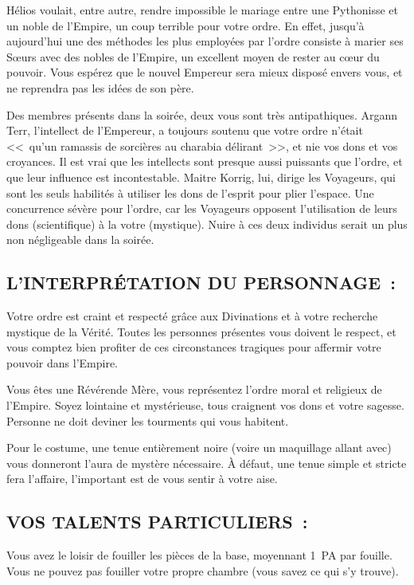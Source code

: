\documentclass[14pt,twocolumn]{extarticle}
\begin{document}
Hélios voulait, entre autre, rendre impossible le mariage entre une Pythonisse
et un noble de l'Empire, un coup terrible pour votre ordre. En effet, jusqu'à
aujourd'hui une des méthodes les plus employées par l'ordre consiste à marier
ses S\oe{}urs avec des nobles de l'Empire, un excellent moyen de rester au
c\oe{}ur du pouvoir. Vous espérez que le nouvel Empereur sera mieux disposé
envers vous, et ne reprendra pas les idées de son père.

Des membres présents dans la soirée, deux vous sont très antipathiques. Argann
Terr, l'intellect de l'Empereur, a toujours soutenu que votre ordre n'était
<<~qu'un ramassis de sorcières au charabia délirant~>>, et nie vos dons et vos
croyances. Il est vrai que les intellects sont presque aussi puissants que
l'ordre, et que leur influence est incontestable. Maitre Korrig, lui, dirige
les Voyageurs, qui sont les seuls habilités à utiliser les dons de l'esprit
pour plier l'espace. Une concurrence sévère pour l'ordre, car les Voyageurs
opposent l'utilisation de leurs dons (scientifique) à la votre (mystique).
Nuire à ces deux individus serait un plus non négligeable dans la soirée.

\subsection{L'INTERPRÉTATION DU PERSONNAGE~:}

Votre ordre est craint et respecté grâce aux Divinations et à votre recherche
mystique de la Vérité. Toutes les personnes présentes vous doivent le respect,
et vous comptez bien profiter de ces circonstances tragiques pour affermir
votre pouvoir dans l'Empire.

Vous êtes une Révérende Mère, vous représentez l'ordre moral et religieux
de l'Empire. Soyez lointaine et mystérieuse, tous craignent vos dons et votre
sagesse. Personne ne doit deviner les tourments qui vous habitent.

Pour le costume, une tenue entièrement noire (voire un maquillage allant avec)
vous donneront l'aura de mystère nécessaire. À défaut, une tenue simple et
stricte fera l'affaire, l'important est de vous sentir à votre aise.

\subsection{VOS TALENTS PARTICULIERS~:}

Vous avez le loisir de fouiller les pièces de la base, moyennant 1~PA par
fouille. Vous ne pouvez pas fouiller votre propre chambre (vous savez ce qui
s'y trouve).
\end{document}
